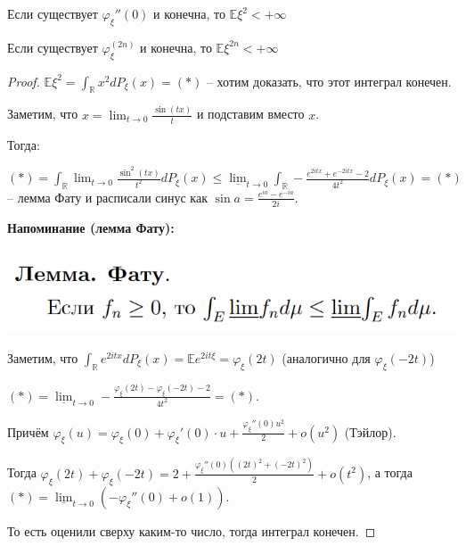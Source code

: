 \begin{theorem}
    Если существует $\varphi_{\xi}''(0)$ и конечна, то $\mathbb{E} \xi^2 < +\infty$
\end{theorem}

\begin{remark}
    Если существует $\varphi_{\xi}^{(2n)}$ и конечна, то $\mathbb{E} \xi^{2n} < +\infty$
\end{remark}

\begin{proof}
    $\mathbb{E} \xi^2 = \int_{\mathbb{R}} x^2 dP_{\xi} (x) = (*)$ -- хотим доказать, что этот интеграл конечен.

    Заметим, что $x = \lim_{t \to 0} \frac{\sin (tx)}{t}$ и подставим вместо $x$.

    Тогда:

    $(*) = \int_{\mathbb{R}} \lim_{t \to 0} \frac{\sin^2 (tx)}{t^2} dP_{\xi}(x) \leqslant
    \underline{\lim}_{t \to 0} \int_{\mathbb{R}} -\frac{e^{2itx} + e^{-2itx} - 2}{4t^2} dP_{\xi} (x) = (*)$ -- лемма Фату и расписали синус как $\sin{a} = \frac{e^{ia} - e^{-ia}}{2 i}$.

    \textbf{Напоминание (лемма Фату):}

    \begin{center}
        \includegraphics[scale=0.7]{./assets/03-characteristic-funcs/lemma-phatu.PNG}
    \end{center}

    Заметим, что $\int_{\mathbb{R}} e^{2itx} dP_{\xi} (x) = \mathbb{E}e^{2it\xi} = \varphi_{\xi}(2t)$ (аналогично для $\varphi_{\xi}(-2t)$)

    $(*) = \underline{\lim}_{t \to 0} -\frac{\varphi_{\xi}(2t) - \varphi_{\xi}(-2t) - 2}{4t^2} = (*)$.

    Причём $\varphi_{\xi} (u) = \varphi_{\xi}(0) + \varphi_{\xi}'(0) \cdot u + \frac{\varphi_{\xi}''(0) u^2}{2} + o(u^2)$ (Тэйлор).

    Тогда $\varphi_{\xi}(2t) + \varphi_{\xi}(-2t) = 2 + \frac{\varphi_{\xi}''(0) \left((2t)^2 + (-2t)^2 \right)}{2} + o(t^2)$, а тогда $(*) = \underline{\lim}_{t \to 0} (-\varphi_{\xi}''(0) + o(1))$.

    То есть оценили сверху каким-то число, тогда интеграл конечен.
\end{proof}

